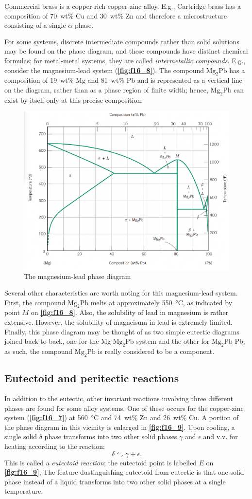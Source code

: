 Commercial brass is a copper-rich copper-zinc alloy. E.g., Cartridge brass has a composition of \qty{70}{wt}\% Cu and \qty{30}{wt}\% Zn and therefore a microstructure consisting of a single $\alpha$ phase.

For some systems, discrete intermediate compounds rather than solid solutions may be found on the phase diagram, and these compounds have distinct chemical formulas; for metal-metal systems, they are called \textit{intermetallic compounds}. E.g., consider the magnesium-lead system (\textbf{\autoref{fig:f16_8}}). The compound $\mathrm{Mg}_2 \mathrm{Pb}$ has a composition of \qty{19}{wt}\% Mg and \qty{81}{wt}\% Pb and is represented as a vertical line on the diagram, rather than as a phase region of finite width; hence, $\mathrm{Mg}_2 \mathrm{Pb}$ can exist by itself only at this precise composition.

\begin{figure} [ht]
  \centering
  \includegraphics[width=0.35\linewidth]{./figures/f16_8.png}
  \caption{The magnesium-lead phase diagram}
  \label{fig:f16_8}
\end{figure}

Several other characteristics are worth noting for this magnesium-lead system. First, the compound $\mathrm{Mg}_2 \mathrm{Pb}$ melts at approximately \qty{550}{\celsius}, as indicated by point $M$ on \textbf{\autoref{fig:f16_8}}. Also, the solubility of lead in magnesium is rather extensive. However, the solubility of magneisum in lead is extremely limited. Finally, this phase diagram may be thought of as two simple eutectic diagrams joined back to back, one for the Mg-$\mathrm{Mg}_2 \mathrm{Pb}$ system and the other for $\mathrm{Mg}_2 \mathrm{Pb}$-Pb; as such, the compound $\mathrm{Mg}_2 \mathrm{Pb}$ is really considered to be a component.


\subsection{Eutectoid and peritectic reactions}
In addition to the eutectic, other invariant reactions involving three different phases are found for some alloy systems. One of these occurs for the copper-zinc system (\textbf{\autoref{fig:f16_7}}) at \qty{560}{\celsius} and \qty{74}{wt}\% Zn and \qty{26}{wt}\% Cu. A portion of the phase diagram in this vicinity is enlarged in \textbf{\autoref{fig:f16_9}}. Upon cooling, a single solid $\delta$ phase transforms into two other solid phases $\gamma$ and $\epsilon$ and v.v. for heating according to the reaction:
\[ 
\delta \leftrightharpoons \gamma + \epsilon
.\]
This is called a \textit{eutectoid reaction}; the eutectoid point is labelled $E$ on \textbf{\autoref{fig:f16_9}}, The feature dustinguishing eutectoid from eutectic is that one solid phase instead of a liquid transforms into two other solid phases at a single temperature. 

